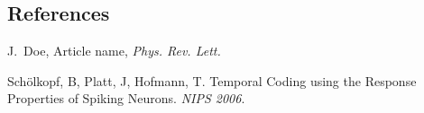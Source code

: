 \documentclass[final]{beamer}
\begin{document}
\begin{frame}[t]
\begin{multicols}{2}


\subsection{References}

\begin{thebibliography}{99}

 J.~Doe, Article name, \textit{Phys. Rev. Lett.}

Schölkopf, B, Platt, J, Hofmann, T. Temporal Coding using the Response Properties of Spiking Neurons. \textit{NIPS 2006}.
\end{thebibliography}

\end{multicols}

\end{frame}
\end{document}
